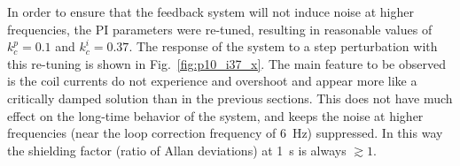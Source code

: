 In order to ensure that the feedback system will not induce noise at
higher frequencies, the PI parameters were re-tuned, resulting in
reasonable values of $k_c^p=0.1$ and $k_c^i=0.37$.  The response of the
system to a step perturbation with this re-tuning is shown in
Fig.~\ref{fig:p10_i37_x}.  The main feature to be observed is the
coil currents do not experience and overshoot and appear more like a
critically damped solution than in the previous sections.  This does
not have much effect on the long-time behavior of the system, and
keeps the noise at higher frequencies (near the loop correction
frequency of 6~Hz) suppressed.  In this way the shielding factor
(ratio of Allan deviations) at 1~s is always $\gtrsim 1$.




